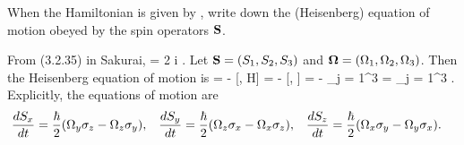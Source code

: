 \newcommand{\Sx}{S_x}

\clearpage
\begin{problem}
	When the Hamiltonian is given by , write down the (Heisenberg) equation of motion obeyed by the spin operators $\mathbf{S}$.
\end{problem}

\begin{solution}
	From (3.2.35) in Sakurai,
	\beq
		[\sigi, \sigj] = 2 i \lct \sigk.
	\eeq
	Let $\mathbf{S} = (S_1, S_2, S_3)$ and $\boldsymbol{\Omega} = (\Omega_1, \Omega_2, \Omega_3)$.  Then the Heisenberg equation of motion is
	\beq
		 = - [\Si, H] = - [\sigi, \Ods] = - \sum_{j = 1}^3 \Omj [\sigi, \sigj] =  \sum_{j = 1}^3 \Omj \lct \sigk.
	\eeq
	Explicitly, the equations of motion are
	\begin{align*}
		\dv{\Sx}{t} &= \frac{\hbar}{2} (\Omy \sigz - \Omz \sigy), &
		\dv{\Sy}{t} &= \frac{\hbar}{2} (\Omz \sigx - \Omx \sigz), &
		\dv{\Sz}{t} &= \frac{\hbar}{2} (\Omx \sigy - \Omy \sigx).
	\end{align*}
\end{solution}